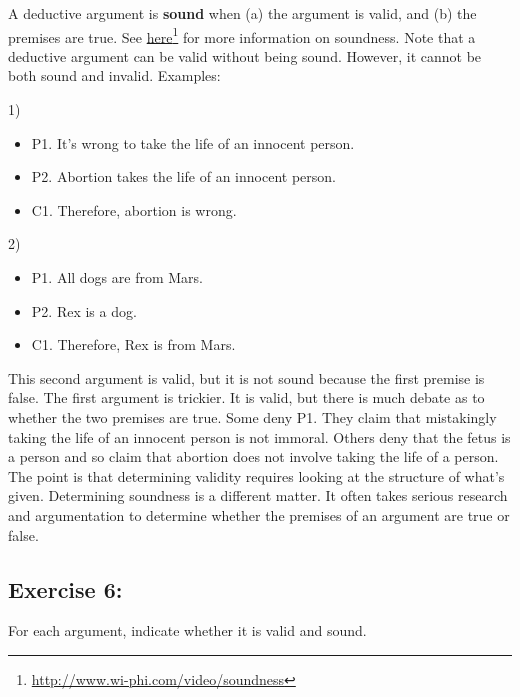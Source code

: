 \documentclass[report,oneside]{memoir}
\begin{document}
A deductive argument is \textbf{sound} when (a) the argument is valid, and (b) the premises are true. See \href{http://www.wi-phi.com/video/soundness}{here}\footnote{\href{http://www.wi-phi.com/video/soundness}{http:/\slash www.wi-phi.com\slash video\slash soundness}} for more information on soundness. Note that a deductive argument can be valid without being sound. However, it cannot be both sound and invalid. Examples:

1) 

\begin{itemize}
\item P1. It's wrong to take the life of an innocent person.

\item P2. Abortion takes the life of an innocent person.

\item C1. Therefore, abortion is wrong.

\end{itemize}

2)

\begin{itemize}
\item P1. All dogs are from Mars.

\item P2. Rex is a dog.

\item C1. Therefore, Rex is from Mars.

\end{itemize}
This second argument is valid, but it is not sound because the first premise is false. The first argument is trickier. It is valid, but there is much debate as to whether the two premises are true. Some deny P1. They claim that mistakingly taking the life of an innocent person is not immoral. Others deny that the fetus is a person and so claim that abortion does not involve taking the life of a person. The point is that determining validity requires looking at the structure of what's given. Determining soundness is a different matter. It often takes serious research and argumentation to determine whether the premises of an argument are true or false.

\subsection{Exercise 6:}
\label{exercise6:}

For each argument, indicate whether it is valid and sound. 
\end{document}
